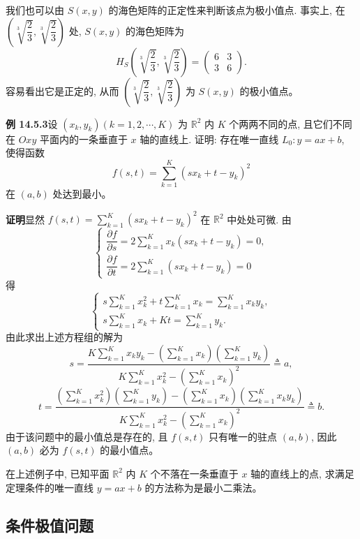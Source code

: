 \documentclass[UTF8,12pt,a4paper,fontset=fandol]{ctexart}
\begin{document}
我们也可以由 $S(x,y)$ 的海色矩阵的正定性来判断该点为极小值点. 事实上, 在 $\left(\sqrt[3]{\dfrac23},\sqrt[3]{\dfrac23}\right)$ 处, $S(x,y)$ 的海色矩阵为
\[
  H_S\left(\sqrt[3]{\frac23},\sqrt[3]{\frac23}\right)
  =
  \begin{pmatrix}
    6 & 3\\
    3 & 6
  \end{pmatrix}.
\]
容易看出它是正定的, 从而 $\left(\sqrt[3]{\dfrac23},\sqrt[3]{\dfrac23}\right)$ 为 $S(x,y)$ 的极小值点。

\noindent\textbf{例 14.5.3}\quad 设 $(x_k,y_k)(k=1,2,\cdots,K)$ 为 $\mathbb R^2$ 内 $K$ 个两两不同的点, 且它们不同在 $Oxy$ 平面内的一条垂直于 $x$ 轴的直线上. 证明: 存在唯一直线 $L_0:y=ax+b$, 使得函数
\[
  f(s,t)=\sum_{k=1}^K(sx_k+t-y_k)^2
\]
在 $(a,b)$ 处达到最小。

\noindent\textbf{证明}\quad 显然 $f(s,t)=\sum\limits_{k=1}^K(sx_k+t-y_k)^2$ 在 $\mathbb R^2$ 中处处可微. 由
\[
  \begin{cases}
    \dfrac{\partial f}{\partial s}
    =2\displaystyle\sum_{k=1}^K x_k(sx_k+t-y_k)=0,\\[1.2ex]
    \dfrac{\partial f}{\partial t}
    =2\displaystyle\sum_{k=1}^K (sx_k+t-y_k)=0
  \end{cases}
\]
得
\[
  \begin{cases}
    s\displaystyle\sum_{k=1}^K x_k^2
    +t\displaystyle\sum_{k=1}^K x_k
    =\displaystyle\sum_{k=1}^K x_ky_k,\\[1.2ex]
    s\displaystyle\sum_{k=1}^K x_k
    +Kt
    =\displaystyle\sum_{k=1}^K y_k.
  \end{cases}
\]
由此求出上述方程组的解为
\[
  s=
  \frac{
    K\displaystyle\sum_{k=1}^K x_ky_k
    -\left(\displaystyle\sum_{k=1}^K x_k\right)
     \left(\displaystyle\sum_{k=1}^K y_k\right)}
  {
    K\displaystyle\sum_{k=1}^K x_k^2
    -\left(\displaystyle\sum_{k=1}^K x_k\right)^2}
  \triangleq a,
\]
\[
  t=
  \frac{
    \left(\displaystyle\sum_{k=1}^K x_k^2\right)
    \left(\displaystyle\sum_{k=1}^K y_k\right)
    -\left(\displaystyle\sum_{k=1}^K x_k\right)
     \left(\displaystyle\sum_{k=1}^K x_ky_k\right)}
  {
    K\displaystyle\sum_{k=1}^K x_k^2
    -\left(\displaystyle\sum_{k=1}^K x_k\right)^2}
  \triangleq b.
\]
由于该问题中的最小值总是存在的, 且 $f(s,t)$ 只有唯一的驻点 $(a,b)$, 因此 $(a,b)$ 必为 $f(s,t)$ 的最小值点。

在上述例子中, 已知平面 $\mathbb R^2$ 内 $K$ 个不落在一条垂直于 $x$ 轴的直线上的点, 求满足定理条件的唯一直线 $y=ax+b$ 的方法称为是最小二乘法。

\subsection{条件极值问题}
\end{document}
